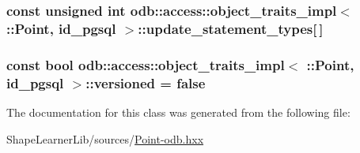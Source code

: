 \subsubsection[{update\+\_\+statement\+\_\+types}]{\setlength{\rightskip}{0pt plus 5cm}const unsigned int odb\+::access\+::object\+\_\+traits\+\_\+impl$<$ \+::{\bf Point}, id\+\_\+pgsql $>$\+::update\+\_\+statement\+\_\+types\mbox{[}$\,$\mbox{]}\hspace{0.3cm}{\ttfamily [static]}}\label{classodb_1_1access_1_1object__traits__impl_3_01_1_1_point_00_01id__pgsql_01_4_aa05a7c6270a4f28a1a1bc9b7fc1dff83}
\hypertarget{classodb_1_1access_1_1object__traits__impl_3_01_1_1_point_00_01id__pgsql_01_4_a7441966224459a7500419abe8938dc5a}{}
\subsubsection[{versioned}]{\setlength{\rightskip}{0pt plus 5cm}const {\bf bool} odb\+::access\+::object\+\_\+traits\+\_\+impl$<$ \+::{\bf Point}, id\+\_\+pgsql $>$\+::versioned = false\hspace{0.3cm}{\ttfamily [static]}}\label{classodb_1_1access_1_1object__traits__impl_3_01_1_1_point_00_01id__pgsql_01_4_a7441966224459a7500419abe8938dc5a}


The documentation for this class was generated from the following file\+:\begin{DoxyCompactItemize}
\item 
Shape\+Learner\+Lib/sources/\hyperlink{_point-odb_8hxx}{Point-\/odb.\+hxx}\end{DoxyCompactItemize}
